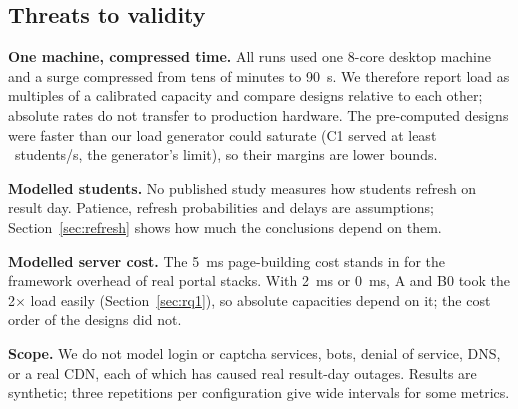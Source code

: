 \subsection{Threats to validity}
\label{sec:threats}

\textbf{One machine, compressed time.} All runs used one 8-core desktop machine and a
surge compressed from tens of minutes to \SI{90}{s}. We therefore report load
as multiples of a calibrated capacity and compare designs relative to each
other; absolute rates do not transfer to production hardware. The
pre-computed designs were faster than our load generator could saturate
(C1 served at least \CapCOne\ students/s, the generator's limit), so their
margins are lower bounds.

\textbf{Modelled students.} No published study measures how students refresh
on result day. Patience, refresh probabilities and delays are assumptions;
Section~\ref{sec:refresh} shows how much the conclusions depend on them.

\textbf{Modelled server cost.} The \SI{5}{ms} page-building cost stands in for
the framework overhead of real portal stacks. With \SI{2}{ms} or \SI{0}{ms},
A and B0 took the 2$\times$ load easily (Section~\ref{sec:rq1}), so absolute
capacities depend on it; the cost order of the designs did not.

\textbf{Scope.} We do not model login or captcha services, bots, denial of
service, DNS, or a real CDN, each of which has caused real result-day outages.
Results are synthetic; three repetitions per configuration give wide
intervals for some metrics.
